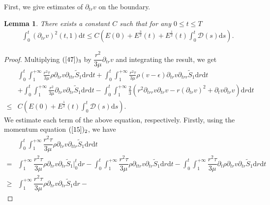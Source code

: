\documentclass[10pt,reqno]{amsart}
\numberwithin{equation}{section}
\newtheorem{lemma}[theorem]{Lemma}
\begin{document}
	First, we give estimates of $\partial_{tr} v$ on the boundary.
	\begin{lemma}\label{lem7_tx}
		There exists a constant $C$ such that for any $0\leq t \leq T$
		\begin{equation}\label{bdy_tx}
			\begin{aligned}
				\int_{0}^{t}(\partial_{tr} v)^2(t,1)\mathrm{d}t
				\leq C\left(E(0)+E^{\frac{3}{2}}(t)+E^{\frac{1}{2}}(t) \int_{0}^{t}\mathcal{D}(s)\mathrm{d}s\right).
			\end{aligned}
		\end{equation}
		
	\end{lemma}
	\begin{proof}
		Multiplying  $(\ref{47})_3$ by $\dfrac{r^2}{3\mu}\partial_{tr} v$  and integrating the result, we get
		\begin{align}\label{76}
				&\int_{0}^{t}\int_{1}^{+\infty}\frac{r^2\tau}{3\mu}\rho\partial_{tr} v\partial_{ttr} \tilde{S}_1\mathrm{d}r\mathrm{d}t
				+\int_{0}^{t}\int_{1}^{+\infty}\frac{r^2\tau}{3\mu}\rho (v-\epsilon)\partial_{tr} v\partial_{trr} \tilde{S}_1\mathrm{d}r\mathrm{d}t
				\nonumber \\
				&+\int_{0}^{t}\int_{1}^{+\infty}\frac{r^2}{3\mu}\partial_{tr} v\partial_{tr} \tilde{S}_1\mathrm{d}r\mathrm{d}t-\int_{0}^{t}\int_{1}^{+\infty}\frac{2}{3}\left(r^2\partial_{trr}v \partial_{tr}v-r(\partial_{tr}v)^2 +\partial_{t}v\partial_{tr}v\right)\mathrm{d}r\mathrm{d}t \nonumber \\
				\leq& C\left(E(0)+ E^{\frac{1}{2}}(t) \int_{0}^{t}\mathcal{D}(s)\mathrm{d}s\right)
				.
		\end{align}	
		We estimate each term of the above equation, respectively. Firstly, using the momentum equation $(\ref{15})_2$, we have
		\begin{align}\label{77}
				&\int_{0}^{t}\int_{1}^{+\infty}\dfrac{r^2\tau}{3\mu}\rho\partial_{tr} v\partial_{ttr} \tilde{S}_1\mathrm{d}r\mathrm{d}t \nonumber \\
				=&
				\int_{1}^{+\infty}\dfrac{r^2\tau}{3\mu}\rho\partial_{tr} v \partial_{tr} \tilde{S}_1\big|_0^{t}\mathrm{d}r-
				\int_{0}^{t}\int_{1}^{+\infty}\dfrac{r^2\tau}{3\mu}\rho\partial_{ttr} v \partial_{tr} \tilde{S}_1\mathrm{d}r\mathrm{d}t-
				\int_{0}^{t}\int_{1}^{+\infty}\dfrac{r^2\tau}{3\mu}\partial_{t}\rho
				\partial_{tr} v \partial_{tr} \tilde{S}_1\mathrm{d}r\mathrm{d}t \nonumber \\
				\geq& \int_{1}^{+\infty}\dfrac{r^2\tau}{3\mu}\rho\partial_{tr} v\partial_{tr} \tilde{S}_1\mathrm{d}r-

\end{align}
\end{proof}
\end{document}
